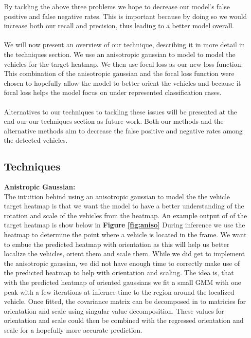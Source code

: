 \documentclass[letter]{article}
\newcommand{\fref}[1]{\textbf{Figure \ref{#1}}}
\begin{document}
	By tackling the above three problems we hope to decrease our model's false positive and false negative rates. This is important because by doing so we would increase both our recall and precision, thus leading to a better model overall.\\\\
	We will now present an overview of our technique, describing it in more detail in the techniques section. We use an anisotropic gaussian to model to model the vehicles for the target heatmap. We then use focal loss as our new loss function. This combination of the anisotropic gaussian and the focal loss function were chosen to hopefully allow the model to better orient the vehicles and because it focal loss helps the model focus on under represented classification cases.\\\\
	Alternatives to our techniques to tackling these issues will be presented at the end our our techniques section as future work. Both our methods and the alternative methods aim to decrease the false positive and negative rates among the detected vehicles.

	\subsection{Techniques}
	\textbf{Anistropic Gaussian:}\\
    The intuition behind using an anisotropic gaussian to model the the vehicle target heatmap is that we want the model to have a better understanding of the rotation and scale of the vehicles from the heatmap. An example output of of the target heatmap is show below in \fref{fig:aniso} During inference we use the heatmap to determine the point where a vehicle is located in the frame. We want to embue the predicted heatmap with orientation as this will help us better localize the vehicles, orient them and scale them. While we did get to implement the anisotropic gaussian, we did not have enough time to correctly make use of the predicted heatmap to help with orientation and scaling. The idea is, that with the predicted heatmap of oriented gaussians we fit a small GMM with one peak with a few iterations at infernce time to the region around the localized vehicle. Once fitted, the covariance matrix can be decomposed in to matricies for orientation and scale using singular value decomposition. These values for orientation and scale could then be combined with the regressed orientation and scale for a hopefully more accurate prediction.
\end{document}
